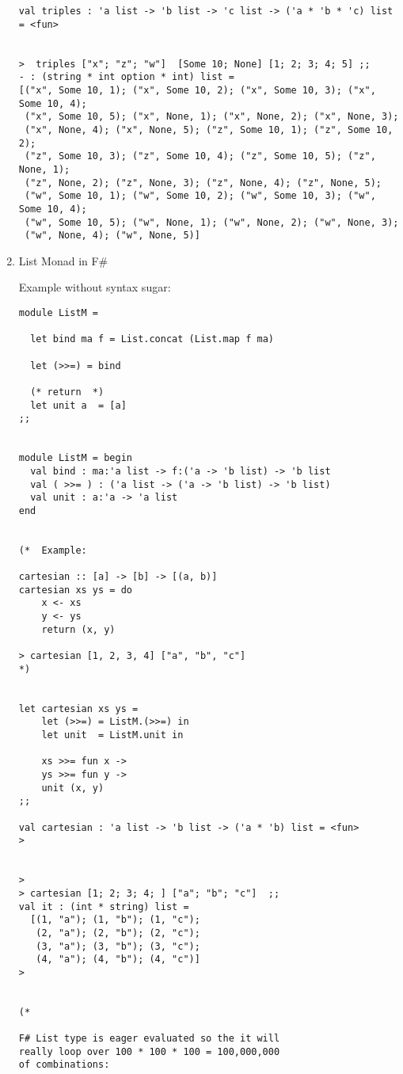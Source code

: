 \documentclass[11pt]{article}
\begin{document}
\begin{enumerate}
\begin{verbatim}
val triples : 'a list -> 'b list -> 'c list -> ('a * 'b * 'c) list = <fun>


>  triples ["x"; "z"; "w"]  [Some 10; None] [1; 2; 3; 4; 5] ;;
- : (string * int option * int) list =
[("x", Some 10, 1); ("x", Some 10, 2); ("x", Some 10, 3); ("x", Some 10, 4);
 ("x", Some 10, 5); ("x", None, 1); ("x", None, 2); ("x", None, 3);
 ("x", None, 4); ("x", None, 5); ("z", Some 10, 1); ("z", Some 10, 2);
 ("z", Some 10, 3); ("z", Some 10, 4); ("z", Some 10, 5); ("z", None, 1);
 ("z", None, 2); ("z", None, 3); ("z", None, 4); ("z", None, 5);
 ("w", Some 10, 1); ("w", Some 10, 2); ("w", Some 10, 3); ("w", Some 10, 4);
 ("w", Some 10, 5); ("w", None, 1); ("w", None, 2); ("w", None, 3);
 ("w", None, 4); ("w", None, 5)]
\end{verbatim}

\item List Monad in F\#
\label{sec-1-13-2-3}

Example without syntax sugar: 

\begin{verbatim}
module ListM =

  let bind ma f = List.concat (List.map f ma)

  let (>>=) = bind 

  (* return  *)
  let unit a  = [a]
;;


module ListM = begin
  val bind : ma:'a list -> f:('a -> 'b list) -> 'b list
  val ( >>= ) : ('a list -> ('a -> 'b list) -> 'b list)
  val unit : a:'a -> 'a list
end


(*  Example:

cartesian :: [a] -> [b] -> [(a, b)]
cartesian xs ys = do
    x <- xs 
    y <- ys 
    return (x, y)

> cartesian [1, 2, 3, 4] ["a", "b", "c"]
*)


let cartesian xs ys =  
    let (>>=) = ListM.(>>=) in 
    let unit  = ListM.unit in 
   
    xs >>= fun x ->
    ys >>= fun y ->
    unit (x, y) 
;;

val cartesian : 'a list -> 'b list -> ('a * 'b) list = <fun>                                                           > 


> 
> cartesian [1; 2; 3; 4; ] ["a"; "b"; "c"]  ;;
val it : (int * string) list =
  [(1, "a"); (1, "b"); (1, "c"); 
   (2, "a"); (2, "b"); (2, "c"); 
   (3, "a"); (3, "b"); (3, "c"); 
   (4, "a"); (4, "b"); (4, "c")]
> 


(*  

F# List type is eager evaluated so the it will
really loop over 100 * 100 * 100 = 100,000,000
of combinations:  


\end{verbatim}
\end{enumerate}
\end{document}

